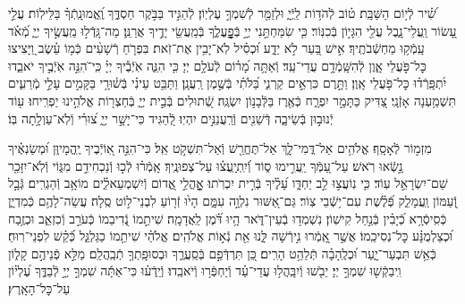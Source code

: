 \documentclass[twoside, openany, parskip=half, 11pt]{book}
\begin{document}


שִׁ֝֗יר לְֿי֥וֹם הַשַּׁבָּֽת׃
ט֗וֹב לְֿהֹד֥וֹת לַֽיְֿיָ֑ וּלְזַמֵּ֖ר לְֿשִׁמְךָ֣ עֶלְיֽוֹן׃
לְֿהַגִּ֣יד בַּבֹּ֣קֶר חַסְדֶּ֑ךָ וֶֽ֝אֱמוּנָֽתְֿךָ֗ בַּלֵּילֽוֹת׃
עֲלֵ֣י עָ֭שׂוֹר וַֽעֲלֵי־נָ֑בֶל עֲלֵ֖י הִגָּי֣וֹן בְּֿכִנּֽוֹר׃
כִּ֤י שִׂמַּחְתַּ֣נִי יְיָ֣ בְּֿפׇׇׇׇׇׇׇָֽעֳלֶ֑ךָ בְּֿמַֽעֲשֵׂ֖י יָדֶ֣יךָ אֲרַנֵּֽן׃
מַה־גָּֽדְֿל֣וּ מַֽעֲשֶׂ֣יךָ יְיָ֑ מְֿ֝אֹ֗ד עָֽמְֿק֥וּ מַחְשְֿׁבֹתֶֽיךָ׃
אִ֣ישׁ בַּ֭עַר לֹ֣א יֵדָ֑ע וּ֝כְסִ֗יל לֹֽא־יָבִ֥ין אֶת־זֹֽאת׃
בִּפְרֹ֤חַ רְֿשָׁעִ֨ים כְּֿמ֥וֹ עֵ֗שֶׂב וַ֭יָּצִיצוּ כׇּל־פֹּ֣עֲלֵי אָ֑וֶן לְֿהִשָּֽׁמְֿדָ֥ם עֲדֵי־עַֽד׃
וְֿאַתָּ֥ה מָ֝ר֗וֹם לְֿעֹלָ֥ם יְיָ׃
כִּ֤י הִנֵּ֢ה אֹֽיְֿבֶ֡יךָ יְיָ֗ כִּֽי־ֹהִנֵּ֣ה אֹֽיְֿבֶ֣יךָ יֹאבֵ֑דוּ יִ֝תְפָּֽרְֿד֗וּ כׇּל־פֹּ֥עֲלֵי אָֽוֶן׃
וַתָּ֣רֶם כִּרְאֵ֣ים קַרְנִ֑י בַּ֝לֹּתִ֗י בְּֿשֶׁ֣מֶן רַֽעֲנָֽן׃
וַתַּבֵּ֥ט עֵינִ֗י בְּֿשׁ֫וּרָ֥י בַּקָּמִ֣ים עָלַ֣י מְֿרֵעִ֑ים תִּשְׁמַ֥עְנָה אָזְֿנָֽי׃
צַ֭דִּיק כַּתָּמָ֣ר יִפְרָ֑ח כְּֿאֶ֖רֶז בַּלְּֿבָנ֣וֹן יִשְׂגֶּֽה׃
שְֿׁ֭תוּלִים בְּֿבֵ֣ית יְיָ֑ בְּֿחַצְר֖וֹת אֱלֹהֵ֣ינוּ יַפְרִֽיחוּ׃
ע֖וֹד יְֿנוּב֣וּן בְּֿשֵׂיבָ֑ה דְּֿשֵׁנִ֖ים וְֿרַֽעֲנַנִּ֣ים יִהְיֽוּ׃
לְֿ֭הַגִּיד כִּי־יָשָׁ֣ר יְיָ֑ צ֝וּרִ֗י וְֿלֹֽא־עַוְלָ֥תָה בּֽוֹ׃


מִזְמ֣וֹר לְֿאָסָֽף׃ אֱלֹהִ֥ים אַל־דֳּמִי־לָ֑ךְ אַל־תֶּחֱרַ֖שׁ וְֿאַל־תִּשְׁקֹ֣ט אֵֽל׃ כִּי־הִנֵּ֣ה אֽ֭וֹיְֿבֶיךָ יֶֽהֱמָיוּ֑ן וּ֝מְשַׂנְאֶ֗יךָ נָ֣שְֿׂאוּ רֹֽאשׁ׃ עַל־עַ֭מְּֿךָ יַֽעֲרִ֣ימוּ ס֑וֹד וְֿ֝יִֽתְיָֽעֲצ֗וּ עַל־צְפוּנֶֽיךָ׃ אָֽמְֿר֗וּ לְֿכ֣וּ וְֿנַכְחִידֵ֣ם מִגּ֑וֹי וְֿלֹֽא־יִזָּכֵ֖ר שֵׁם־יִשְׂרָאֵ֣ל עֽוֹד׃ כִּ֤י נֽוֹעֲצ֣וּ לֵ֣ב יַחְדָּ֑ו עָ֝לֶ֗יךָ בְּֿרִ֣ית יִכְרֹֽתוּ׃ אׇׇׇׇׇׇָֽהֳלֵ֣י אֱ֭דוֹם וְֿיִשְׁמְעֵאלִ֑֗ים מוֹאָ֥ב וְֿהַגְרִֽים׃ גְּֿבָ֣ל וְֿ֭עַמּוֹן וַֽעֲמָלֵ֑ק פְּֿ֝לֶ֗שֶׁת עִם־י֥שְֿׁבֵי צֽוֹר׃ גַּם־אַ֭שּׁוּר נִלְוָ֣ה עִמָּ֑ם הָי֙וּ זְֿר֖וֹעַ לִבְנֵי־ל֣וֹט סֶֽלָה׃ עֲשֵׂה־לָהֶ֥ם כְּֿמִדְיָ֑ן כְּֿסִֽיסְֿרָ֥א כְֿ֝יָבִ֗ין בְּֿנַ֣חַל קִישֽׁוֹן׃ נִשְׁמְד֥וּ בְֿעֵין־דֹּ֑אר הָ֥יוּ דֹּ֝֗מֶן לַֽאֲדָמָֽה׃ שִׁיתֵ֣מוֹ נְֿ֭דִיבֵמוֹ כְּֿעֹרֵ֣ב וְֿכִזְאֵ֑ב וּכְזֶ֥בַח וּ֝כְצַלְמֻנָּ֗ע כׇּל־נְסִיכֵֽמוֹ׃ אֲשֶׁ֣ר אָֽ֭מְֿרוּ נִ֣ירְֿשָׁה לָּ֑נוּ אֵ֖ת נְֿא֣וֹת אֱלֹהִֽים׃ אֱלֹהַ֗י שִׁיתֵ֥מוֹ כַגַּלְגַּ֑ל כְּֿ֝קַ֗שׁ לִפְנֵי־רֽוּחַ׃ כְּֿאֵ֥שׁ תִּבְעַר־יָ֑עַר וּ֝כְלֶֽהָבָ֗ה תְּֿלַהֵ֥ט הָרִֽים׃ כֵּ֭ן תִּרְדְּֿפֵ֣ם בְּֿסַֽעֲרֶ֑ךָ וּבְסוּפָֽתְךָ֥ תְֿבַֽהֲלֵֽם׃ מַלֵּ֣א פְֿנֵיהֶ֣ם קָל֑וֹן וִֽיבַקְֿשׁ֖וּ שִׁמְךָ֣ יְיָ׃ יֵבֹ֖שׁוּ וְֿיִבָּֽהֲל֥וּ עֲדֵי־עַ֗ד וְֿיַחְפְּֿר֥וּ וְֿיֹאבֵֽדוּ׃ וְֿיֵֽדְֿע֗וּ כִּי־אַתָּ֬ה שִׁמְךָ֣ יְיָ֣ לְֿבַדֶּ֑ךָ עֶ֝לְי֗וֹן עַל־כׇּל־הָאָֽרֶץ׃

\mournerskaddish
\end{document}
